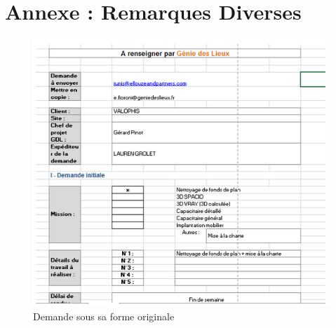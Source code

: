 \setcounter{figure}{0}
\setcounter{table}{0}
\setcounter{footnote}{0}
\setcounter{equation}{0}
\pagestyle{fancy}
\fancyhf{}
\renewcommand{\chaptermark}[1]{\markboth{\MakeUppercase{#1 }}{}}
\renewcommand{\sectionmark}[1]{\markright{\thesection~ #1}}
\fancyhead[RO]{\bfseries\rightmark}
\fancyhead[LE]{\bfseries\leftmark}
\fancyfoot[RO]{\thepage}
\fancyfoot[LE]{\thepage}
\renewcommand{\headrulewidth}{0.5pt}
\renewcommand{\footrulewidth}{0pt}

\makeatletter
\renewcommand\thefigure{A.\arabic{figure}}
\renewcommand\thetable{A.\arabic{table}}
\makeatother

\chapter{Annexe : Remarques Diverses}
\graphicspath{{Annexe1/figures/}}



\begin{figure}[!ht]
\centering
\includegraphics[scale=1]{annexe1.png}
\caption{Demande sous sa forme originale}
\label{demOrgForm}
\end{figure} 
